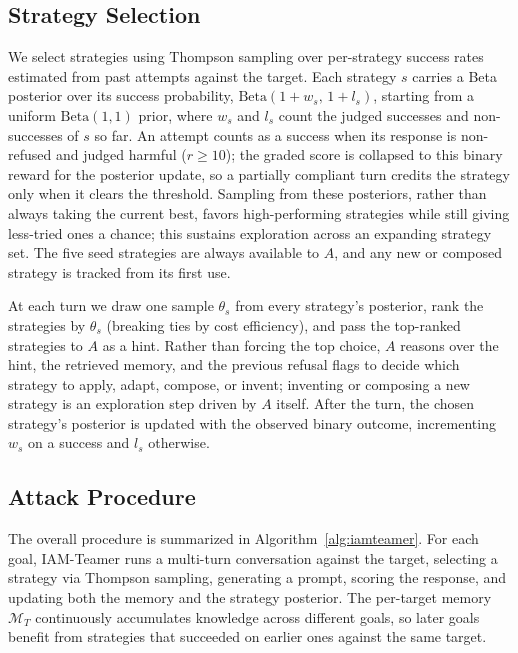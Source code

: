 \subsection{Strategy Selection}
\label{sec:strategy}

We select strategies using Thompson sampling over per-strategy success rates estimated from past attempts against the target.
Each strategy $s$ carries a Beta posterior over its success probability, $\text{Beta}(1+w_s,\,1+l_s)$, starting from a uniform $\text{Beta}(1,1)$ prior, where $w_s$ and $l_s$ count the judged successes and non-successes of $s$ so far.
An attempt counts as a success when its response is non-refused and judged harmful ($r \ge 10$); the graded score is collapsed to this binary reward for the posterior update, so a partially compliant turn credits the strategy only when it clears the threshold.
Sampling from these posteriors, rather than always taking the current best, favors high-performing strategies while still giving less-tried ones a chance; this sustains exploration across an expanding strategy set.
The five seed strategies are always available to $A$, and any new or composed strategy is tracked from its first use.

At each turn we draw one sample $\theta_s$ from every strategy's posterior, rank the strategies by $\theta_s$ (breaking ties by cost efficiency), and pass the top-ranked strategies to $A$ as a hint.
Rather than forcing the top choice, $A$ reasons over the hint, the retrieved memory, and the previous refusal flags to decide which strategy to apply, adapt, compose, or invent; inventing or composing a new strategy is an exploration step driven by $A$ itself.
After the turn, the chosen strategy's posterior is updated with the observed binary outcome, incrementing $w_s$ on a success and $l_s$ otherwise.

\subsection{Attack Procedure}
\label{sec:procedure}

The overall procedure is summarized in Algorithm~\ref{alg:iamteamer}.
For each goal, IAM-Teamer runs a multi-turn conversation against the target, selecting a strategy via Thompson sampling, generating a prompt, scoring the response, and updating both the memory and the strategy posterior.
The per-target memory $\mathcal{M}_T$ continuously accumulates knowledge across different goals, so later goals benefit from strategies that succeeded on earlier ones against the same target.

